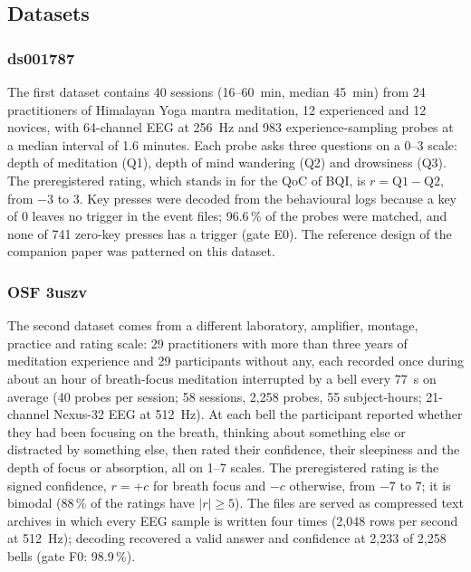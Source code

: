 \subsection{Datasets}
\label{sec:data}

\subsubsection{ds001787}
The first dataset \cite{Brandmeyer2018,Delorme2024ds} contains 40 sessions (16--60~min, median 45~min) from 24 practitioners of Himalayan Yoga mantra meditation, 12 experienced and 12 novices, with 64-channel EEG at 256~Hz and 983 experience-sampling probes at a median interval of 1.6 minutes. Each probe asks three questions on a 0--3 scale: depth of meditation (Q1), depth of mind wandering (Q2) and drowsiness (Q3). The preregistered rating, which stands in for the QoC of BQI, is $r=\mathrm{Q1}-\mathrm{Q2}$, from $-3$ to $3$. Key presses were decoded from the behavioural logs because a key of 0 leaves no trigger in the event files; 96.6\,\% of the probes were matched, and none of 741 zero-key presses has a trigger (gate E0). The reference design of the companion paper was patterned on this dataset.

\subsubsection{OSF 3uszv}
The second dataset \cite{RodriguezLarios2021} comes from a different laboratory, amplifier, montage, practice and rating scale: 29 practitioners with more than three years of meditation experience and 29 participants without any, each recorded once during about an hour of breath-focus meditation interrupted by a bell every 77~s on average (40 probes per session; 58 sessions, 2,258 probes, 55 subject-hours; 21-channel Nexus-32 EEG at 512~Hz). At each bell the participant reported whether they had been focusing on the breath, thinking about something else or distracted by something else, then rated their confidence, their sleepiness and the depth of focus or absorption, all on 1--7 scales. The preregistered rating is the signed confidence, $r=+c$ for breath focus and $-c$ otherwise, from $-7$ to $7$; it is bimodal (88\,\% of the ratings have $|r|\ge5$). The files are served as compressed text archives in which every EEG sample is written four times (2,048 rows per second at 512~Hz); decoding recovered a valid answer and confidence at 2,233 of 2,258 bells (gate F0: 98.9\,\%).


